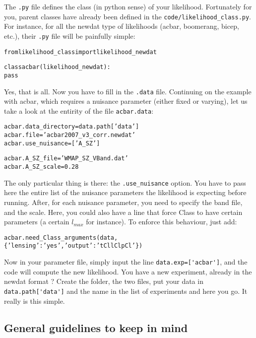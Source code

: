 \documentclass[10pt]{article}
\begin{document}
  The \verb?.py? file defines the class (in python sense) of your likelihood.
  Fortunately for you, parent classes have already been defined in the
  \verb?code/likelihood_class.py?. For instance, for all the newdat type of
  likelihoods (acbar, boomerang, bicep, etc.), their \verb?.py? file will be
  painfully simple:

  \begin{alltt}
  from likelihood_class import likelihood_newdat

  class acbar(likelihood_newdat):
    pass
  \end{alltt}

  Yes, that is all. Now you have to fill in the \verb?.data? file. Continuing
  on the example with acbar, which requires a nuisance parameter (either fixed
  or varying), let us take a look at the entirity of the file
  \verb?acbar.data?:
  
  \begin{alltt}
    acbar.data_directory = data.path['data']
    acbar.file           = 'acbar2007_v3_corr.newdat'
    acbar.use_nuisance   = ['A_SZ']

    acbar.A_SZ_file      = 'WMAP_SZ_VBand.dat'
    acbar.A_SZ_scale     = 0.28
  \end{alltt}

  The only particular thing is there: the \verb?.use_nuisance? option. You have
  to pass here the entire list of the nuisance parameters the likelihood is
  expecting before running. After, for each nuisance parameter, you need to
  specify the band file, and the scale. Here, you could also have a line that
  force Class to have certain parameters (a certain $l_{max}$ for instance). To enforce this behaviour, just add:
  \begin{alltt}
    acbar.need_Class_arguments(data,\{'lensing':'yes', 'output':'tCl lCl pCl'\})
  \end{alltt}

  Now in your parameter file, simply input the line \verb?data.exp=['acbar']?,
  and the code will compute the new likelihood. You have a new experiment,
  already in the newdat format ? Create the folder, the two files, put your
  data in \verb?data.path['data']? and the name in the list of experiments and
  here you go. It really is this simple.

  \subsection{General guidelines to keep in mind}
\end{document}

